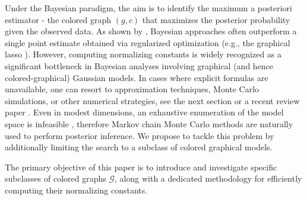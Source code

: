 \documentclass[12pt]{amsart}
\theoremstyle{plain}
\theoremstyle{definition}
\theoremstyle{remark}
\newcommand{\1}{\mathbf{1}}
\begin{document}
Under the Bayesian paradigm, the aim is to identify the maximum a posteriori estimator - the colored graph $(g,c)$ that maximizes the posterior probability given the observed data. As shown by \citet{MohWit15,Moh24}, Bayesian approaches often outperform a single point estimate obtained via regularized optimization (e.g., the graphical lasso \citep{glasso}).
However, computing normalizing constants is widely recognized as a significant bottleneck in Bayesian analyses involving graphical (and hence colored-graphical) Gaussian models. In cases where explicit formulas are unavailable, one can resort to approximation techniques, Monte Carlo simulations, or other numerical strategies, see the next section or a recent review paper \citep{Moh24}. Even in modest dimensions, an exhaustive enumeration of the model space is infeasible \citep{Ge11}, therefore Markov chain Monte Carlo methods are naturally used to perform posterior inference. We propose to tackle this problem by additionally limiting the search to a subclass of colored graphical models.

The primary objective of this paper is to introduce and investigate specific subclasses of colored graphs $\mathcal{G}$, along with a dedicated methodology for efficiently computing their normalizing constants. 
\end{document}
